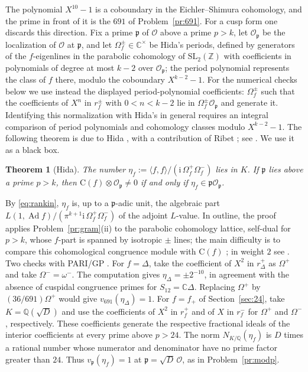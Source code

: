 \documentclass[reqno]{amsart}
\theoremstyle{definition}
\theoremstyle{plain}
\newtheorem{theorem}{Theorem}[section]
\newcommand{\Z}{\mathbb{Z}}
\newcommand{\Q}{\mathbb{Q}}
\newcommand{\C}{\mathbb{C}}
\newcommand{\Oc}{\mathcal{O}}
\newcommand{\pp}{\mathfrak{p}}
\newcommand{\Ad}{\operatorname{Ad}}
\newcommand{\Cg}{\mathrm{C}}
\newcommand{\ii}{\mathrm{i}}
\begin{document}
The polynomial \(X^{10} - 1\) is a coboundary in the Eichler--Shimura cohomology, and the prime in front of it is the \(691\) of Problem~\ref{pr:691}.  For a cusp form one discards this direction.  Fix a prime \(\pp\) of \(\Oc\) above a prime \(p > k\), let \(\Oc_\pp\) be the localization of \(\Oc\) at \(\pp\), and let \(\Omega_f^\pm \in \C^\times\) be Hida's periods, defined by generators of the \(f\)-eigenlines in the parabolic cohomology of \(\mathrm{SL}_2(\Z)\) with coefficients in polynomials of degree at most \(k - 2\) over \(\Oc_\pp\); the period polynomial represents the class of \(f\) there, modulo the coboundary \(X^{k-2} - 1\).  For the numerical checks below we use instead the displayed period-polynomial coefficients: \(\Omega_f^\pm\) such that the coefficients of \(X^n\) in \(r_f^\pm\) with \(0 < n < k-2\) lie in \(\Omega_f^\pm \Oc_\pp\) and generate it.  Identifying this normalization with Hida's in general requires an integral comparison of period polynomials and cohomology classes modulo \(X^{k-2} - 1\).  The following theorem is due to Hida \cite{Hi1,Hi2}, with a contribution of Ribet \cite{Ri}; see \cite[Thm.~1]{Gh}.  We use it as a black box.

\begin{theorem}[Hida]\label{thm:hida}
The number \(\eta_f := \langle f, f \rangle / (\ii\,\Omega_f^+ \Omega_f^-)\) lies in \(K\).  If \(\pp\) lies above a prime \(p > k\), then \(\Cg(f) \otimes \Oc_\pp \ne 0\) if and only if \(\eta_f \in \pp\Oc_\pp\).
\end{theorem}

By \eqref{eq:rankin}, \(\eta_f\) is, up to a \(\pp\)-adic unit, the algebraic part \(L(1, \Ad f)/(\pi^{k+1}\ii\,\Omega_f^+\Omega_f^-)\) of the adjoint \(L\)-value.  In outline, the proof applies Problem~\ref{pr:gram}(ii) to the parabolic cohomology lattice, self-dual for \(p > k\), whose \(f\)-part is spanned by isotropic \(\pm\) lines; the main difficulty is to compare this cohomological congruence module with \(\Cg(f)\) \cite[\S3]{Gh}; in weight \(2\) see \cite[\S4.4]{DDT}.  Two checks with PARI/GP \cite{PARI}.  For \(f=\Delta\), take the coefficient of \(X^2\) in \(r_\Delta^+\) as \(\Omega^+\) and take \(\Omega^-=\omega^-\).  The computation gives \(\eta_\Delta=\pm 2^{-10}\), in agreement with the absence of cuspidal congruence primes for \(S_{12}=\C\Delta\).  Replacing \(\Omega^+\) by \((36/691)\Omega^+\) would give \(v_{691}(\eta_\Delta)=1\).  For \(f=f_+\) of Section~\ref{sec:24}, take \(K=\Q(\sqrt D)\) and use the coefficients of \(X^2\) in \(r_f^+\) and of \(X\) in \(r_f^-\) for \(\Omega^+\) and \(\Omega^-\), respectively.  These coefficients generate the respective fractional ideals of the interior coefficients at every prime above \(p>24\).  The norm \(N_{K/\Q}(\eta_f)\) is \(D\) times a rational number whose numerator and denominator have no prime factor greater than \(24\).  Thus \(v_\pp(\eta_f)=1\) at \(\pp=\sqrt D\,\Oc\), as in Problem~\ref{pr:modp}.
\end{document}
